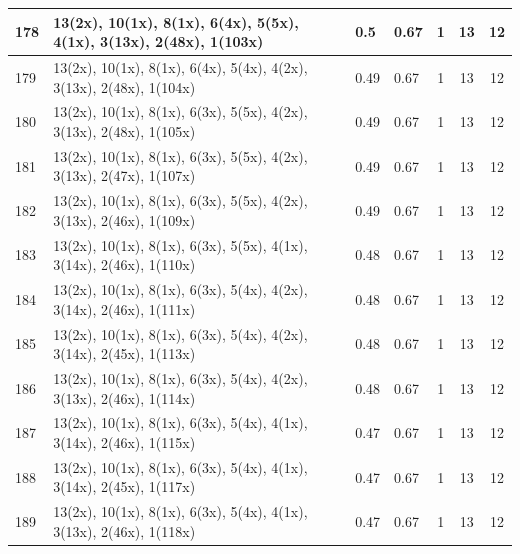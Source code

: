 \begin{small}
\begin{longtable}{|p{0.5cm}|p{9cm}|p{1.3cm}|p{1.3cm}|c|c|c|}
  178 & 13(2x), 10(1x), 8(1x), 6(4x), 5(5x), 4(1x), 3(13x), 2(48x), 1(103x) & \cellcolor{colorGood}  0.5 & \cellcolor{colorGood} 0.67 & 1 & 13 & \cellcolor{colorGood} 12 \\   \hline
  179 & 13(2x), 10(1x), 8(1x), 6(4x), 5(4x), 4(2x), 3(13x), 2(48x), 1(104x) & \cellcolor{colorGood}  0.49 & \cellcolor{colorGood} 0.67 & 1 & 13 & \cellcolor{colorGood} 12 \\   \hline
  180 & 13(2x), 10(1x), 8(1x), 6(3x), 5(5x), 4(2x), 3(13x), 2(48x), 1(105x) & \cellcolor{colorGood}  0.49 & \cellcolor{colorGood} 0.67 & 1 & 13 & \cellcolor{colorGood} 12 \\   \hline
  181 & 13(2x), 10(1x), 8(1x), 6(3x), 5(5x), 4(2x), 3(13x), 2(47x), 1(107x) & \cellcolor{colorGood}  0.49 & \cellcolor{colorGood} 0.67 & 1 & 13 & \cellcolor{colorGood} 12 \\   \hline
  182 & 13(2x), 10(1x), 8(1x), 6(3x), 5(5x), 4(2x), 3(13x), 2(46x), 1(109x) & \cellcolor{colorGood}  0.49 & \cellcolor{colorGood} 0.67 & 1 & 13 & \cellcolor{colorGood} 12 \\   \hline
  183 & 13(2x), 10(1x), 8(1x), 6(3x), 5(5x), 4(1x), 3(14x), 2(46x), 1(110x) & \cellcolor{colorGood}  0.48 & \cellcolor{colorGood} 0.67 & 1 & 13 & \cellcolor{colorGood} 12 \\   \hline
  184 & 13(2x), 10(1x), 8(1x), 6(3x), 5(4x), 4(2x), 3(14x), 2(46x), 1(111x) & \cellcolor{colorGood}  0.48 & \cellcolor{colorGood} 0.67 & 1 & 13 & \cellcolor{colorGood} 12 \\   \hline
  185 & 13(2x), 10(1x), 8(1x), 6(3x), 5(4x), 4(2x), 3(14x), 2(45x), 1(113x) & \cellcolor{colorGood}  0.48 & \cellcolor{colorGood} 0.67 & 1 & 13 & \cellcolor{colorGood} 12 \\   \hline
  186 & 13(2x), 10(1x), 8(1x), 6(3x), 5(4x), 4(2x), 3(13x), 2(46x), 1(114x) & \cellcolor{colorGood}  0.48 & \cellcolor{colorGood} 0.67 & 1 & 13 & \cellcolor{colorGood} 12 \\   \hline
  187 & 13(2x), 10(1x), 8(1x), 6(3x), 5(4x), 4(1x), 3(14x), 2(46x), 1(115x) & \cellcolor{colorGood}  0.47 & \cellcolor{colorGood} 0.67 & 1 & 13 & \cellcolor{colorGood} 12 \\   \hline
  188 & 13(2x), 10(1x), 8(1x), 6(3x), 5(4x), 4(1x), 3(14x), 2(45x), 1(117x) & \cellcolor{colorGood}  0.47 & \cellcolor{colorGood} 0.67 & 1 & 13 & \cellcolor{colorGood} 12 \\   \hline
  189 & 13(2x), 10(1x), 8(1x), 6(3x), 5(4x), 4(1x), 3(13x), 2(46x), 1(118x) & \cellcolor{colorGood}  0.47 & \cellcolor{colorGood} 0.67 & 1 & 13 & \cellcolor{colorGood} 12 \\   \hline

\end{longtable}
\end{small}
